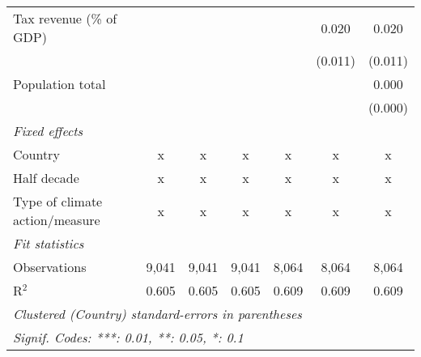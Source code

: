 \begin{tabular}{lcccccc}
   Tax revenue (\% of GDP)                                           &              &               &               &               & 0.020         & 0.020\\   
                                                                     &              &               &               &               & (0.011)       & (0.011)\\   
   Population total                                                  &              &               &               &               &               & 0.000\\   
                                                                     &              &               &               &               &               & (0.000)\\   
   \emph{Fixed effects}\\
   Country                                                           & x            & x             & x             & x             & x             & x\\  
   Half decade                                                       & x            & x             & x             & x             & x             & x\\  
   Type of climate action/measure                                    & x            & x             & x             & x             & x             & x\\  
   \midrule \emph{Fit statistics}\\
   Observations                                                      & 9,041        & 9,041         & 9,041         & 8,064         & 8,064         & 8,064\\  
   R$^2$                                                             & 0.605        & 0.605         & 0.605         & 0.609         & 0.609         & 0.609\\  
   \midrule
   \multicolumn{7}{l}{\emph{Clustered (Country) standard-errors in parentheses}}\\
   \multicolumn{7}{l}{\emph{Signif. Codes: ***: 0.01, **: 0.05, *: 0.1}}\\
\end{tabular}
\par\endgroup


